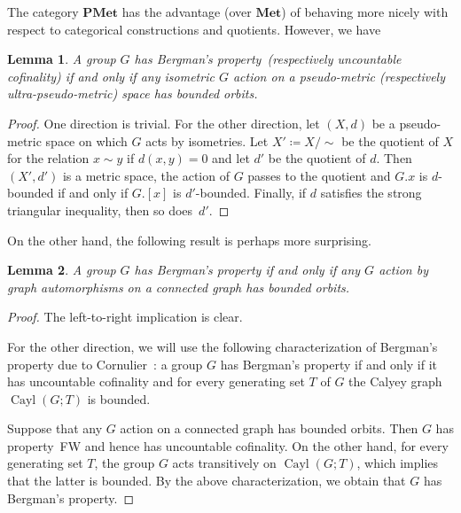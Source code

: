 \documentclass[a4paper]{article}
\newtheorem{lem}{Lemma}[section]
\theoremstyle{definition}
\DeclareMathOperator\Cayley{Cayl}
\newcommand*{\category}[1]{\textbf{#1}}
\newcommand*{\PMet}{\category{PMet}}
\newcommand*{\FW}{FW}
\begin{document}
The category $\PMet$ has the advantage (over $\category{Met}$) of behaving more nicely with respect to categorical constructions and quotients.
However, we have
%
%
\begin{lem}\label{Lemma:BergQPMet}
A group $G$ has Bergman's property~(respectively uncountable cofinality) if and only if any isometric $G$ action on a pseudo-metric (respectively ultra-pseudo-metric) space has bounded orbits.
\end{lem}
\begin{proof}
One direction is trivial.
For the other direction, let $(X,d)$ be a pseudo-metric space on which $G$ acts by isometries.
Let $X'\coloneqq X/\sim$ be the quotient of $X$ for the relation $x\sim y$ if $d(x,y)=0$ and let $d'$ be the quotient of $d$.
Then $(X',d')$ is a metric space, the action of $G$ passes to the quotient and $G.x$ is $d$-bounded if and only if $G.[x]$ is $d'$-bounded.
Finally, if $d$ satisfies the strong triangular inequality, then so does~$d'$.
\end{proof}
%
%
On the other hand, the following result is perhaps more surprising.
%
%
\begin{lem}
A group $G$ has Bergman's property if and only if any $G$ action by graph automorphisms on a connected graph has bounded orbits.
\end{lem}
\begin{proof}
The left-to-right implication is clear.

For the other direction, we will use the following characterization of Bergman's property due to Cornulier~\cite{MR2240370}: a group $G$ has Bergman's property if and only if it has uncountable cofinality and for every generating set $T$ of $G$ the Calyey graph $\Cayley(G;T)$ is bounded.

Suppose that any $G$ action on a connected graph has bounded orbits.
Then $G$ has property~\FW{} and hence has uncountable cofinality.
On the other hand, for every generating set $T$, the group $G$ acts transitively on $\Cayley(G;T)$, which implies that the latter is bounded.
By the above characterization, we obtain that $G$ has Bergman's property.
\end{proof}
\end{document}
